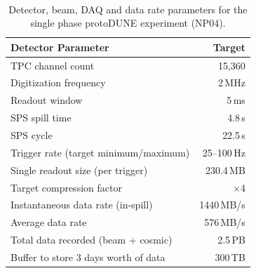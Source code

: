 \documentclass[a4paper]{jpconf}
\newcommand{\pd}{protoDUNE\xspace}
\begin{document}

\begin{table}
\begin{center}
\caption[GPS Detector Locations]{\label{table:np04_data_rate}
  Detector, beam, DAQ and data rate parameters for the single phase
  \pd experiment (NP04).}
\ \\
\begin{tabularx}{0.75\textwidth}{ X  >{\setlength{\hsize}{0.8\hsize}}r}
\hline
Detector Parameter & Target \\
\hline
TPC channel count & 15,360 \\
Digitization frequency & 2\,MHz \\
Readout window & 5\,ms \\
SPS spill time& 4.8\,s\\
SPS cycle& 22.5\,s\\
Trigger rate (target minimum/maximum) & 25--100\,Hz \\
Single readout size (per trigger) & 230.4\,MB \\
Target compression factor& $\times$4 \\
Instantaneous data rate (in-spill) & 1440\,MB/s \\
Average data rate & 576\,MB/s \\
Total data recorded (beam + cosmic) & 2.5\,PB\\
Buffer to store 3 days worth of data & 300\,TB\\
\hline
\end{tabularx}
\end{center}
\end{table}
\end{document}
